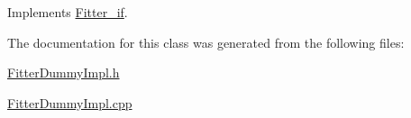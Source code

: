 Implements \hyperlink{class_fitter__if_aa2d2f13548a09a2f727a4190a6b9c2dd}{Fitter\+\_\+if}.



The documentation for this class was generated from the following files\+:\begin{DoxyCompactItemize}
\item 
\hyperlink{_fitter_dummy_impl_8h}{Fitter\+Dummy\+Impl.\+h}\item 
\hyperlink{_fitter_dummy_impl_8cpp}{Fitter\+Dummy\+Impl.\+cpp}\end{DoxyCompactItemize}

